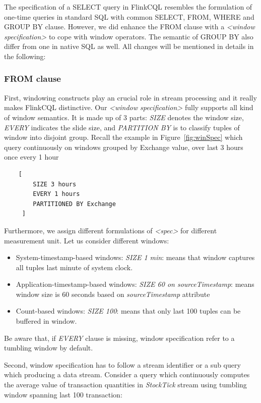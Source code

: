 The specification of a SELECT query in FlinkCQL resembles the formulation of one-time queries in standard SQL with common SELECT, FROM, WHERE and GROUP BY clause. However, we did enhance the FROM clause with a \textit{<window specification>} to cope with window operators. The semantic of GROUP BY  also differ from one in native SQL as well. All changes will be mentioned in details in the following:

\subsubsection*{FROM clause}
First, windowing constructs play an crucial role in stream processing and it really makes FlinkCQL distinctive. Our \textit{<window specification>} fully supports all kind of window semantics. It is made up of 3 parts: \textit{SIZE} denotes the window size, \textit{EVERY} indicates the slide size, and \textit{PARTITION BY} is to classify tuples of window into disjoint group. Recall the example in Figure~\ref{fig:winSpec} which query continuously on   windows grouped by Exchange value, over last 3 hours once every 1 hour
\begin{lstlisting}
	[
		SIZE 3 hours 
		EVERY 1 hours 
	 	PARTITIONED BY Exchange
	 ]
\end{lstlisting}

Furthermore, we assign different formulations of \textit{<spec>} for different measurement unit. Let us consider different windows:
\begin{itemize}
	\item System-timestamp-based windows: \textit{SIZE 1 min}: means that window captures all tuples last minute of system clock.
	\item Application-timestamp-based windows: \textit{SIZE 60 on sourceTimestamp}: means window size is 60 seconds based on \textit{sourceTimestamp} attribute
	\item Count-based windows: \textit{SIZE 100}: means that only last 100 tuples can be buffered in window.
\end{itemize}
Be aware that, if \textit{EVERY} clause is missing, window specification refer to a tumbling window by default.


Second, window specification has to follow a stream identifier or a sub query which producing a data stream. Consider a query which continuously computes the average value of transaction quantities in \textit{StockTick} stream using tumbling window spanning last 100 transaction:

